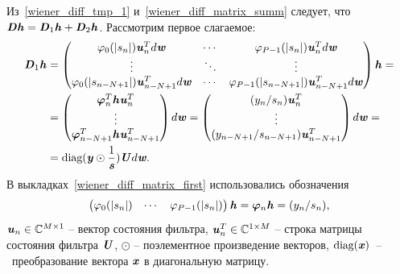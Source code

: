 Из~\eqref{wiener_diff_tmp_1} и~\eqref{wiener_diff_matrix_summ}  следует, что $\textbf{\textit{D}}\textbf{\textit{h}}=\textbf{\textit{D}}_1\textbf{\textit{h}}+\textbf{\textit{D}}_2\textbf{\textit{h}}$. Рассмотрим первое слагаемое:
\begin{align}
	\textbf{\textit{D}}_1\textbf{\textit{h}}&=\begin{pmatrix}
	\varphi_0(|s_n|)\textbf{\textit{u}}_n^Td\textbf{\textit{w}}& \cdots & \varphi_{P-1}(|s_n|)\textbf{\textit{u}}_n^Td\textbf{\textit{w}} \\
	\vdots & \ddots & \vdots \\
	\varphi_{0}(|s_{n-N+1}|)\textbf{\textit{u}}_{n-N+1}^Td\textbf{\textit{w}} & \cdots & \varphi_{P-1}(|s_{n-N+1}|)\textbf{\textit{u}}_{n-N+1}^Td\textbf{\textit{w}} \\
	\end{pmatrix}\textbf{\textit{h}}= \nonumber \\
	&=\begin{pmatrix}
		\bm{\varphi}_n^T\textbf{\textit{h}}\textbf{\textit{u}}_n^T \\
		\vdots \\
		\bm{\varphi}_{n-N+1}^T\textbf{\textit{h}}\textbf{\textit{u}}_{n-N+1}^T
	\end{pmatrix}d\textbf{\textit{w}}=\begin{pmatrix}
	(y_n/s_n)\textbf{\textit{u}}_n^T \\
	\vdots \\
	(y_{n-N+1}/s_{n-N+1})\textbf{\textit{u}}_{n-N+1}^T
	\end{pmatrix}d\textbf{\textit{w}}= \nonumber \\
	&=\text{diag}(\textbf{\textit{y}}\odot\frac{1}{\textbf{\textit{s}}})\textbf{\textit{U}}d\textbf{\textit{w}}.
	\label{wiener_diff_matrix_first}
\end{align}
В выкладках~\eqref{wiener_diff_matrix_first} использовались обозначения
\begin{equation}
	\begin{pmatrix}
		\varphi_0(|s_n|) & \cdots & \varphi_{P-1}(|s_n|)
	\end{pmatrix}\textbf{\textit{h}}=\bm{\varphi}_n\textbf{\textit{h}}=(y_n/s_n),
	\label{wiener_nonlin_state_vect}
\end{equation}
$\textbf{\textit{u}}_n\in\mathbb{C}^{M\times1}$ -- вектор состояния фильтра, $\textbf{\textit{u}}_n^T\in\mathbb{C}^{1\times M}$ -- строка матрицы состояния фильтра $\textbf{\textit{U}}$, $\odot$ -- поэлементное произведение векторов, $\text{diag}(\textbf{\textit{x}})$~--~преобразование вектора $\textbf{\textit{x}}$ в диагональную матрицу. 

